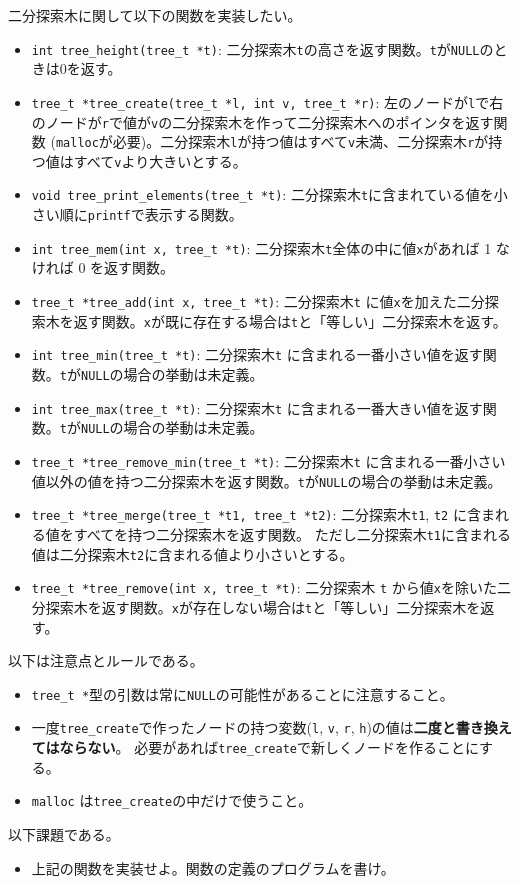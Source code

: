 \documentclass[a4paper,twoside,onecolumn,openany,article]{memoir}
\theoremstyle{remark}
\begin{document}
二分探索木に関して以下の関数を実装したい。
\begin{itemize}
\item \texttt{int tree\_height(tree\_t *t)}: 二分探索木\texttt{t}の高さを返す関数。\texttt{t}が\texttt{NULL}のときは0を返す。
\item \texttt{tree\_t *tree\_create(tree\_t *l, int v, tree\_t *r)}: 左のノードが\texttt{l}で右のノードが\texttt{r}で値が\texttt{v}の二分探索木を作って二分探索木へのポインタを返す関数
(\texttt{malloc}が必要)。二分探索木\texttt{l}が持つ値はすべて\texttt{v}未満、二分探索木\texttt{r}が持つ値はすべて\texttt{v}より大きいとする。
\item \texttt{void tree\_print\_elements(tree\_t *t)}: 二分探索木\texttt{t}に含まれている値を小さい順に\texttt{printf}で表示する関数。
\item \texttt{int tree\_mem(int x, tree\_t *t)}: 二分探索木\texttt{t}全体の中に値\texttt{x}があれば 1 なければ 0 を返す関数。
\item \texttt{tree\_t *tree\_add(int x, tree\_t *t)}: 二分探索木\texttt{t} に値\texttt{x}を加えた二分探索木を返す関数。\texttt{x}が既に存在する場合は\texttt{t}と「等しい」二分探索木を返す。
\item \texttt{int tree\_min(tree\_t *t)}: 二分探索木\texttt{t} に含まれる一番小さい値を返す関数。\texttt{t}が\texttt{NULL}の場合の挙動は未定義。
\item \texttt{int tree\_max(tree\_t *t)}: 二分探索木\texttt{t} に含まれる一番大きい値を返す関数。\texttt{t}が\texttt{NULL}の場合の挙動は未定義。
\item \texttt{tree\_t *tree\_remove\_min(tree\_t *t)}: 二分探索木\texttt{t} に含まれる一番小さい値以外の値を持つ二分探索木を返す関数。\texttt{t}が\texttt{NULL}の場合の挙動は未定義。
\item \texttt{tree\_t *tree\_merge(tree\_t *t1, tree\_t *t2)}: 二分探索木\texttt{t1}, \texttt{t2} に含まれる値をすべてを持つ二分探索木を返す関数。
ただし二分探索木\texttt{t1}に含まれる値は二分探索木\texttt{t2}に含まれる値より小さいとする。
\item \texttt{tree\_t *tree\_remove(int x, tree\_t *t)}: 二分探索木 \texttt{t} から値\texttt{x}を除いた二分探索木を返す関数。\texttt{x}が存在しない場合は\texttt{t}と「等しい」二分探索木を返す。
\end{itemize}
以下は注意点とルールである。
\begin{itemize}
\item \texttt{tree\_t *}型の引数は常に\texttt{NULL}の可能性があることに注意すること。
\item 一度\texttt{tree\_create}で作ったノードの持つ変数(\texttt{l}, \texttt{v}, \texttt{r}, \texttt{h})の値は\textbf{二度と書き換えてはならない}。
必要があれば\texttt{tree\_create}で新しくノードを作ることにする。
\item \texttt{malloc} は\texttt{tree\_create}の中だけで使うこと。
\end{itemize}
以下課題である。
\begin{itemize}
\item 上記の関数を実装せよ。関数の定義のプログラムを書け。
\end{itemize}
\end{document}
